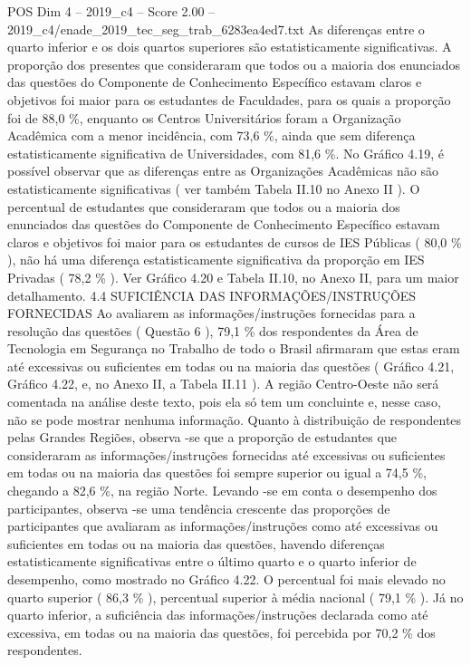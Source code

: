 \begin{textsample}{POS Dim 4 – 2019\_c4 – Score 2.00 – 2019\_c4/enade\_2019\_tec\_seg\_trab\_6283ea4ed7.txt}
As diferenças entre o quarto inferior e os dois quartos superiores são estatisticamente significativas.
A proporção dos presentes que consideraram que todos ou a maioria dos enunciados das questões do Componente de Conhecimento Específico estavam claros e objetivos foi maior para os estudantes de Faculdades, para os quais a proporção foi de 88,0 \%, enquanto os Centros Universitários foram a Organização Acadêmica com a menor incidência, com 73,6 \%, ainda que sem diferença estatisticamente significativa de Universidades, com 81,6 \%.
No Gráfico 4.19, é possível observar que as diferenças entre as Organizações Acadêmicas não são estatisticamente significativas ( ver também Tabela II.10 no Anexo II ).
O percentual de estudantes que consideraram que todos ou a maioria dos enunciados das questões do Componente de Conhecimento Específico estavam claros e objetivos foi maior para os estudantes de cursos de IES Públicas ( 80,0 \% ), não há uma diferença estatisticamente significativa da proporção em IES Privadas ( 78,2 \% ).
Ver Gráfico 4.20 e Tabela II.10, no Anexo II, para um maior detalhamento. 4.4 SUFICIÊNCIA DAS INFORMAÇÕES/INSTRUÇÕES FORNECIDAS Ao avaliarem as informações/instruções fornecidas para a resolução das questões ( Questão 6 ), 79,1 \% dos respondentes da Área de Tecnologia em Segurança no Trabalho de todo o Brasil afirmaram que estas eram até excessivas ou suficientes em todas ou na maioria das questões ( Gráfico 4.21, Gráfico 4.22, e, no Anexo II, a Tabela II.11 ).
A região Centro-Oeste não será comentada na análise deste texto, pois ela só tem um concluinte e, nesse caso, não se pode mostrar nenhuma informação.
Quanto à distribuição de respondentes pelas Grandes Regiões, observa -se que a proporção de estudantes que consideraram as informações/instruções fornecidas até excessivas ou suficientes em todas ou na maioria das questões foi sempre superior ou igual a 74,5 \%, chegando a 82,6 \%, na região Norte.
Levando -se em conta o desempenho dos participantes, observa -se uma tendência crescente das proporções de participantes que avaliaram as informações/instruções como até excessivas ou suficientes em todas ou na maioria das questões, havendo diferenças estatisticamente significativas entre o último quarto e o quarto inferior de desempenho, como mostrado no Gráfico 4.22.
O percentual foi mais elevado no quarto superior ( 86,3 \% ), percentual superior à média nacional ( 79,1 \% ).
Já no quarto inferior, a suficiência das informações/instruções declarada como até excessiva, em todas ou na maioria das questões, foi percebida por 70,2 \% dos respondentes.

\end{textsample}
